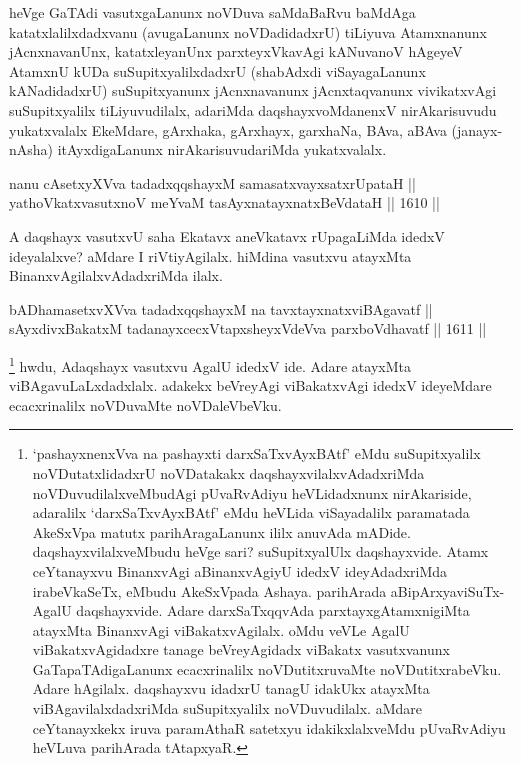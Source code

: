 \begin{artha}
heVge GaTAdi vasutxgaLanunx noVDuva saMdaBaRvu baMdAga katatxlalilxdadxvanu (avugaLanunx noVDadidadxrU) tiLiyuva Atamxnanunx jAcnxnavanUnx, katatxleyanUnx parxteyxVkavAgi kANuvanoV hAgeyeV AtamxnU kUDa suSupitxyalilxdadxrU (shabAdxdi viSayagaLanunx kANadidadxrU) suSupitxyanunx jAcnxnavanunx jAcnxtaqvanunx vivikatxvAgi suSupitxyalilx tiLiyuvudilalx, adariMda daqshayxvoMdanenxV nirAkarisuvudu yukatxvalalx EkeMdare, gArxhaka, gArxhayx, garxhaNa, BAva, aBAva (janayx-nAsha) itAyxdigaLanunx nirAkarisuvudariMda yukatxvalalx.
\end{artha}


\begin{shl}
nanu cAsetxyXVva tadadxqqshayxM samasatxvayxsatxrUpataH || \\
yathoVkatxvasutxnoV meYvaM tasAyxnatayxnatxBeVdataH \hfill || 1610 ||  
\end{shl}

\begin{artha}
A daqshayx vasutxvU saha Ekatavx aneVkatavx rUpagaLiMda idedxV ideyalalxve? aMdare I  riVtiyAgilalx. hiMdina vasutxvu atayxMta BinanxvAgilalxvAdadxriMda ilalx.
\end{artha}


\begin{shl}
bADhamasetxvXVva tadadxqqshayxM na tavxtayxnatxviBAgavatf || \\
sAyxdivxBakatxM tadanayxcecxVtapxsheyxVdeVva parxboVdhavatf \hfill || 1611 ||  
\end{shl}

\begin{artha}
\footnote{`pashayxnenxVva na pashayxti darxSaTxvAyxBAtf' eMdu suSupitxyalilx noVDutatxlidadxrU noVDatakakx daqshayxvilalxvAdadxriMda noVDuvudilalxveMbudAgi pUvaRvAdiyu heVLidadxnunx nirAkariside, adaralilx `darxSaTxvAyxBAtf' eMdu heVLida viSayadalilx paramatada AkeSxVpa matutx parihAragaLanunx ililx anuvAda mADide. daqshayxvilalxveMbudu heVge sari? suSupitxyalUlx daqshayxvide. Atamx ceYtanayxvu BinanxvAgi aBinanxvAgiyU idedxV ideyAdadxriMda irabeVkaSeTx, eMbudu AkeSxVpada Ashaya. parihArada aBipArxyaviSuTx- AgalU daqshayxvide. Adare darxSaTxqqvAda parxtayxgAtamxnigiMta atayxMta BinanxvAgi viBakatxvAgilalx. oMdu veVLe AgalU viBakatxvAgidadxre tanage beVreyAgidadx viBakatx vasutxvanunx GaTapaTAdigaLanunx ecacxrinalilx noVDutitxruvaMte noVDutitxrabeVku. Adare hAgilalx. daqshayxvu idadxrU tanagU idakUkx atayxMta viBAgavilalxdadxriMda suSupitxyalilx noVDuvudilalx. aMdare ceYtanayxkekx iruva paramAthaR satetxyu idakikxlalxveMdu pUvaRvAdiyu heVLuva parihArada tAtapxyaR.}
hwdu, Adaqshayx vasutxvu AgalU idedxV ide. Adare atayxMta viBAgavuLaLxdadxlalx. adakekx beVreyAgi viBakatxvAgi idedxV ideyeMdare ecacxrinalilx noVDuvaMte noVDaleVbeVku.
\end{artha}

